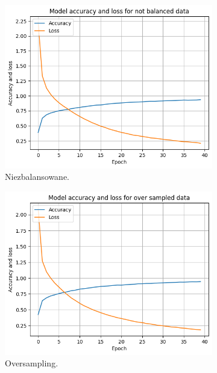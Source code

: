 \begin{figure}[H]
    \begin{subfigure}{.33\textwidth}
        \centering
        \includegraphics[width=\textwidth]{img/not_balanced_acc_loss.png}
        \caption{Niezbalansowane.}
        \label{fig:accu_loss_not_balanced}
    \end{subfigure}
    \begin{subfigure}{.33\textwidth}
        \centering
        \includegraphics[width=\textwidth]{img/over_acc_loss.png}
        \caption{Oversampling.}
        \label{fig:loss}
    \end{subfigure}
    \begin{subfigure}{.33\textwidth}

\end{subfigure}
\end{figure}
